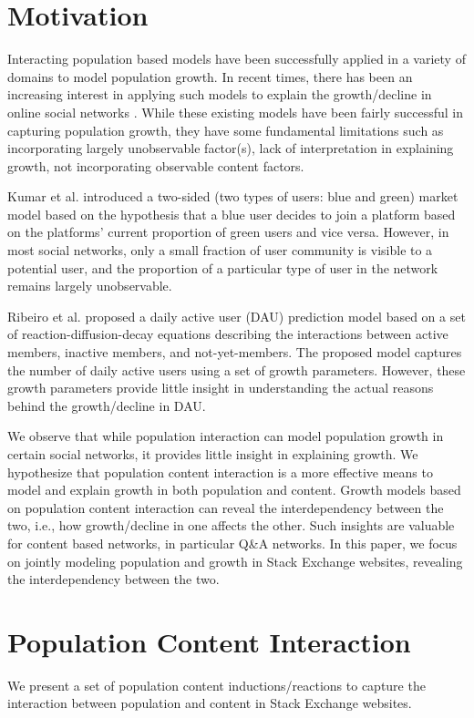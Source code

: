 \section{Motivation}
Interacting population based models have been successfully applied in a variety of domains to model population growth.  In recent times, there has been an increasing interest in applying such models to explain the growth/decline in online social networks \cite{Ribeiro2014,Kumar2010}. While these existing models have been fairly successful in capturing population growth, they have some fundamental limitations such as incorporating largely unobservable factor(s), lack of interpretation in explaining growth, not incorporating observable content factors. %

Kumar et al. \cite{Kumar2010} introduced a two-sided (two types of users: blue and green) market model based on the hypothesis that a blue user decides to join a platform based on the platforms' current proportion of green users and vice versa. However, in most social networks, only a small fraction of user community is visible to a potential user, and the proportion of a particular type of user in the network remains largely unobservable.

Ribeiro et al. \cite{Ribeiro2014} proposed a daily active user (DAU) prediction model based on a set of reaction-diffusion-decay equations describing the interactions between active members, inactive members, and not-yet-members. The proposed model captures the number of daily active users using a set of growth parameters. However, these growth parameters provide little insight in understanding the actual reasons behind the growth/decline in DAU.

We observe that while population interaction can model population growth in certain social networks, it provides little insight in explaining growth. We hypothesize that population content interaction is a more effective means to model and explain growth in both population and content. Growth models based on population content interaction can reveal the interdependency between the two, i.e., how growth/decline in one affects the other. Such insights are valuable for content based networks, in particular Q\&A networks. In this paper, we focus on jointly modeling population and growth in Stack Exchange websites, revealing the interdependency between the two.

\section{Population Content Interaction}
We present a set of population content inductions/reactions to capture the interaction between population and content in Stack Exchange websites. %


